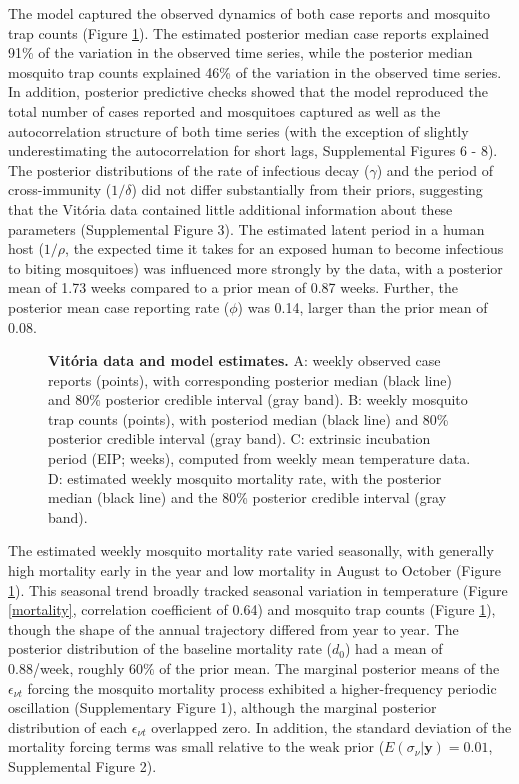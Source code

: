 \documentclass[10pt,letterpaper]{article}
\begin{document}
The model captured the observed dynamics of both case reports and mosquito trap counts (Figure \ref{timeseries}).
The estimated posterior median case reports explained 91\% of the variation in the observed time series, while the posterior median mosquito trap counts explained 46\% of the variation in the observed time series. 
In addition, posterior predictive checks showed that the model reproduced the total number of cases reported and mosquitoes captured as well as the autocorrelation structure of both time series (with the exception of slightly underestimating the autocorrelation for short lags, Supplemental Figures 6 - 8).
The posterior distributions of the rate of infectious decay ($\gamma$) and the period of cross-immunity ($1/\delta$) did not differ substantially from their priors, suggesting that the Vit\'oria data contained little additional information about these parameters (Supplemental Figure 3).
The estimated latent period in a human host ($1/\rho$, the expected time it takes for an exposed human to become infectious to biting mosquitoes) was influenced more strongly by the data, with a posterior mean of 1.73 weeks compared to a prior mean of 0.87 weeks.
Further, the posterior mean case reporting rate ($\phi$) was 0.14, larger than the prior mean of 0.08.

\begin{figure}[!h]
\caption{{\bf Vit\'oria data and model estimates.}
A: weekly observed case reports (points), with corresponding posterior median (black line) and 80\% posterior credible interval (gray band). B: weekly mosquito trap counts (points), with posteriod median (black line) and 80\% posterior credible interval (gray band). C: extrinsic incubation period (EIP; weeks), computed from weekly mean temperature data. D: estimated weekly mosquito mortality rate, with the posterior median (black line) and the 80\% posterior credible interval (gray band).
}
\label{timeseries}
\end{figure}

The estimated weekly mosquito mortality rate varied seasonally, with generally high mortality early in the year and low mortality in August to October (Figure \ref{timeseries}).
This seasonal trend broadly tracked seasonal variation in temperature (Figure \ref{mortality}, correlation coefficient of 0.64) and mosquito trap counts (Figure \ref{timeseries}), though the shape of the annual trajectory differed from year to year.
The posterior distribution of the baseline mortality rate ($d_0$) had a mean of 0.88/week, roughly $60\%$ of the prior mean.
The marginal posterior means of the $\epsilon_{\nu t}$ forcing the mosquito mortality process exhibited a higher-frequency periodic oscillation (Supplementary Figure 1), although the marginal posterior distribution of each $\epsilon_{\nu t}$ overlapped zero.
In addition, the standard deviation of the mortality forcing terms was small relative to the weak prior ($E(\sigma_{\nu}|\mathbf{y}) = 0.01$, Supplemental Figure 2).
\end{document}
